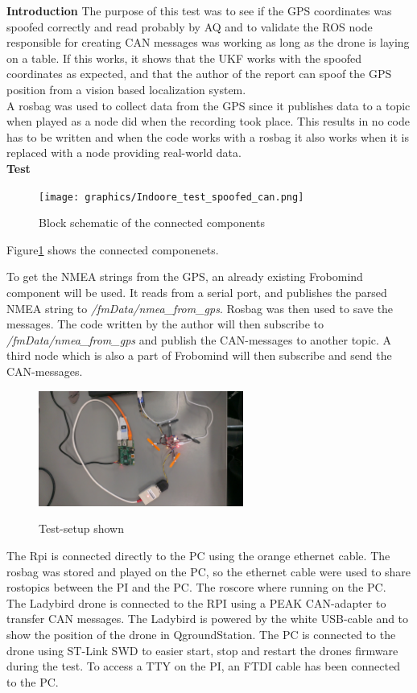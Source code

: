 \textbf{Introduction}
The purpose of this test was to see if the GPS coordinates was spoofed correctly and read probably by AQ and to validate the ROS node responsible for creating CAN messages was working as long as the drone is laying on a table. If this works, it shows that the UKF works with the spoofed coordinates as expected, and that the author of the report can spoof the GPS position from a vision based localization system. \\

A rosbag was used to collect data from the GPS since it publishes data to a topic when played as a node did when the recording took place. This results in no code has to be written and when the code works with a rosbag it also works when it is replaced with a node providing real-world data. \\

\textbf{Test}
\begin{figure}[H]
    \center
    \texttt{[image: graphics/Indoore\_test\_spoofed\_can.png]}
    \caption{Block schematic of the connected components}
    \label{fig:test_block}
\end{figure}


Figure\ref{fig:test_block} shows the connected componenets. 


To get the NMEA strings from the GPS, an already existing Frobomind component will be used. It reads from a serial port, and publishes the parsed NMEA string to \textit{/fmData/nmea\_from\_gps}. Rosbag was then used to save the messages.
The code written by the author will then subscribe to \textit{/fmData/nmea\_from\_gps} and publish the CAN-messages to another topic. A third node which is also a part of Frobomind will then subscribe and send the CAN-messages.

\begin{figure}[H]
    \center
    \includegraphics[width=0.6\textwidth]{graphics/test_test_setup_hw.jpg}
  \label{fig:boat1}
  \caption{Test-setup shown}
\end{figure}


The Rpi is connected directly to the PC using the orange ethernet cable.
The rosbag was stored and played on the PC, so the ethernet cable were used to share rostopics between the PI and the PC. The roscore where running on the PC.\\
The Ladybird drone is connected to the RPI using a PEAK CAN-adapter to transfer CAN messages. The Ladybird is powered by the white USB-cable and to show the position of the drone in QgroundStation. The PC is connected to the drone using ST-Link SWD to easier start, stop and restart the drones firmware during the test. To access a \ac{TTY} on the PI, an FTDI cable has been connected to the PC.


